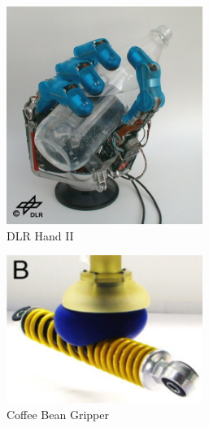\begin{figure}
\begin{subfigure}{.3\linewidth}
        \includegraphics[width=0.7\textwidth]{Images/Hand-II-01.jpg}   
        \caption[DLR Hand II]{DLR Hand II \cite{DLRHandIIpic}}
        \label{fig:DLR Hand II}
    \end{subfigure}
    \begin{subfigure}{.3\linewidth}
        \centering
      \includegraphics[width=0.7\textwidth]{Images/CoffeeBeanGripper.png}   
        \caption[Coffee Bean Gripper]{Coffee Bean Gripper \cite{ParticleJamming}}
        \label{fig:Coffee Bean Gripper}
    \end{subfigure}
    \begin{subfigure}{.3\linewidth}
        \centering

\end{subfigure}
\end{figure}
